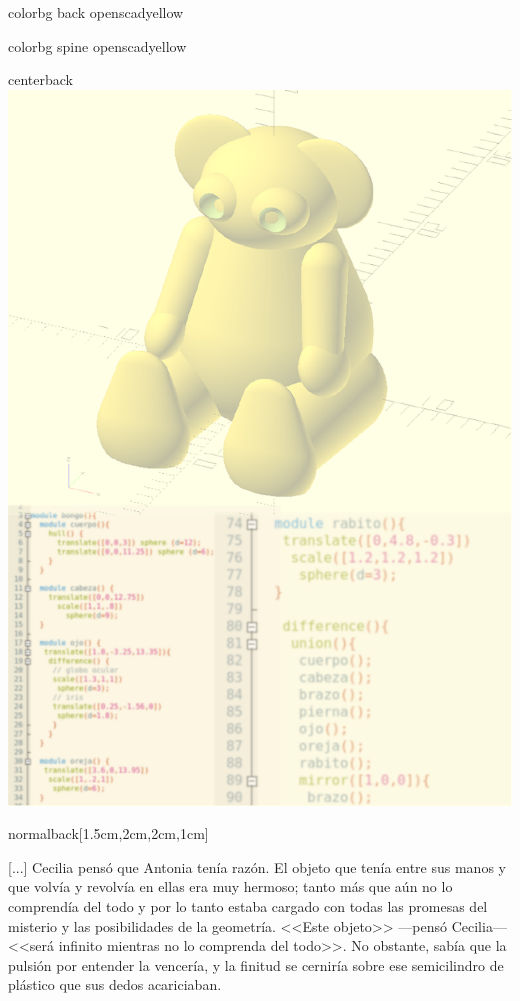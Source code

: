 \documentclass[coverheight=210mm,coverwidth=148.5mm, bleedwidth=13mm,
spinewidth=13mm, foldingmargin, marklength=4mm, 11pt]{bookcover}
\begin{document}
\begin{bookcover}

   \begin{bookcoverelement}{color}{bg back}
     openscadyellow
   \end{bookcoverelement}
   \begin{bookcoverelement}{color}{bg spine}
     openscadyellow
   \end{bookcoverelement}


  \begin{bookcoverelement}{center}{back}
    \includegraphics{contratapa-A5.pdf}
  \end{bookcoverelement}


  \begin{bookcoverelement}{normal}{back}[1.5cm,2cm,2cm,1cm]
    {\large

      \hspace{.5em} [...] Cecilia pensó que Antonia tenía
      razón. El objeto que tenía entre sus manos y que volvía y
      revolvía en ellas era muy hermoso; tanto más que aún no lo
      comprendía del todo y por lo tanto estaba cargado con todas las
      promesas del misterio y las posibilidades de la
      geometría. <<Este objeto>> ---pensó Cecilia--- <<será infinito
      mientras no lo comprenda del todo>>. No obstante, sabía que la
      pulsión por entender la vencería, y la finitud se cerniría sobre
      ese semicilindro de plástico que sus dedos acariciaban.

}
\end{bookcoverelement}
\end{bookcover}
\end{document}

